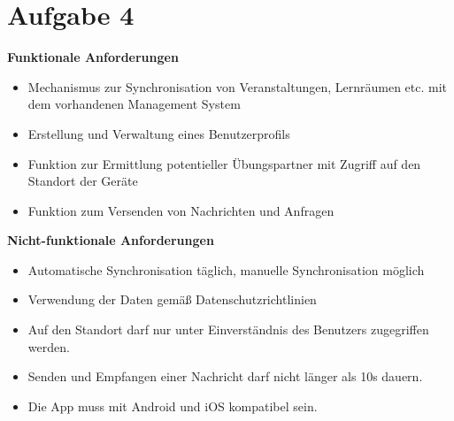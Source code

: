 \documentclass[a4paper,12pt]{article}
\newcommand{\aufgabe}[1]{\section*{Aufgabe #1}}
\begin{document}
\aufgabe{4}
\textbf{Funktionale Anforderungen}
\begin{itemize}
\item Mechanismus zur Synchronisation von Veranstaltungen, Lernräumen etc. mit dem vorhandenen Management System
\item Erstellung und Verwaltung eines Benutzerprofils
\item Funktion zur Ermittlung potentieller Übungspartner mit Zugriff auf den Standort der Geräte
\item Funktion zum Versenden von Nachrichten und Anfragen\\
\end{itemize}
\textbf{Nicht-funktionale Anforderungen}
\begin{itemize}
\item Automatische Synchronisation täglich, manuelle Synchronisation möglich
\item Verwendung der Daten gemäß Datenschutzrichtlinien
\item Auf den Standort darf nur unter Einverständnis des Benutzers zugegriffen werden.
\item Senden und Empfangen einer Nachricht darf nicht länger als 10s dauern.
\item Die App muss mit Android und iOS kompatibel sein.
\end{itemize}
\end{document}
